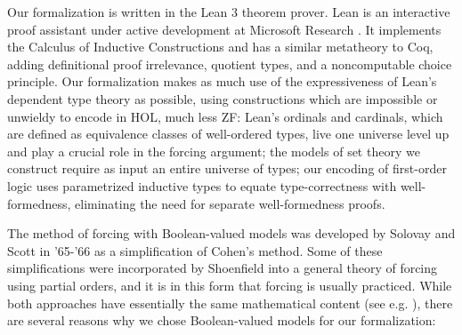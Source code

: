 \documentclass[a4paper,USenglish,cleveref, autoref]{lipics-v2019}
\newcommand{\lil}{\lstinline}
\theoremstyle{theorem}
\theoremstyle{definition}
\begin{document}
Our formalization is written in the Lean 3 theorem prover. Lean is an interactive proof assistant under active development at Microsoft Research \cite{de2015lean, sebastian1}. It implements the Calculus of Inductive Constructions and has a similar metatheory to Coq, adding definitional proof irrelevance, quotient types, and a noncomputable choice principle. %
Our formalization makes as much use of the expressiveness of Lean's dependent type theory as possible, using constructions which are impossible or unwieldy to encode in HOL, much less ZF: Lean's ordinals and cardinals, which are defined as equivalence classes of well-ordered types, live one universe level up and play a crucial role in the forcing argument; the models of set theory we construct require as input an entire universe of types; our encoding of first-order logic uses parametrized inductive types to equate type-correctness with well-formedness, eliminating the need for separate well-formedness proofs.

The method of forcing with Boolean-valued models was developed by Solovay and Scott in '65-'66 \cite{scott1967proof,scott-solovay} as a simplification of Cohen's method. Some of these simplifications were incorporated by Shoenfield \cite{shoenfield1971unramified} into a general theory of forcing using partial orders, and it is in this form that forcing is usually practiced. While both approaches have essentially the same mathematical content (see e.g. \cite{kunen2014set, jech2013set, moore2019method}), there are several reasons why we chose Boolean-valued models for our formalization:
\end{document}
